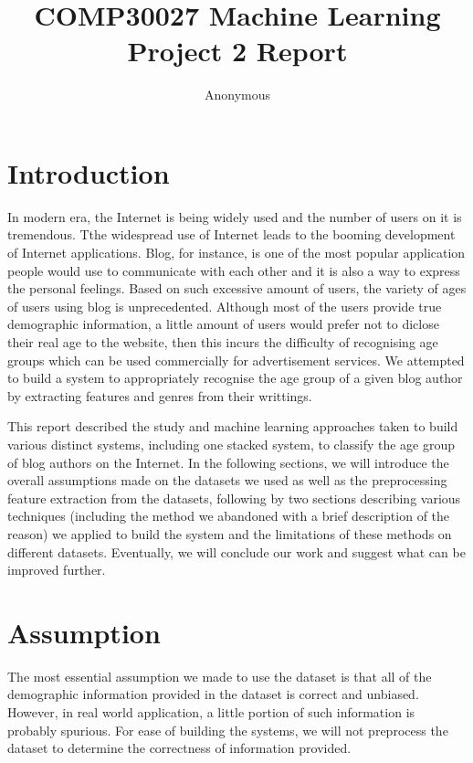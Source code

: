 \documentclass[10pt]{article}
\title{COMP30027 Machine Learning Project 2 Report}
\author{Anonymous}
\begin{document}
\maketitle

\section{Introduction}

In modern era, the Internet is being widely used and the number of users on it is tremendous. Tthe widespread use of Internet leads to the booming development of  Internet applications. Blog, for instance, is one of the most popular application people would use to communicate with each other and it is also a way to express the personal feelings. Based on such excessive amount of users, the variety of ages of users using blog is unprecedented. Although most of the users provide true demographic information, a little amount of users would prefer not to diclose their real age to the website, then this incurs the difficulty of recognising age groups which can be used commercially for advertisement services. We attempted to build a system to appropriately recognise the age group of a given blog author by extracting features and genres from their writtings.

This report described the study and machine learning approaches taken to build various distinct systems, including one stacked system, to classify the age group of blog authors on the Internet. In the following sections, we will introduce the overall assumptions made on the datasets we used as well as the preprocessing feature extraction from the datasets, following by two sections describing various techniques (including the method we abandoned with a brief description of the reason) we applied to build the system and the limitations of these methods on different datasets. Eventually, we will conclude our work and suggest what can be improved further.

\section{Assumption}

The most essential assumption we made to use the dataset is that all of the demographic information provided in the dataset is correct and unbiased. However, in real world application, a little portion of such information is probably spurious. For ease of building the systems, we will not preprocess the dataset to determine the correctness of information provided.
\end{document}
